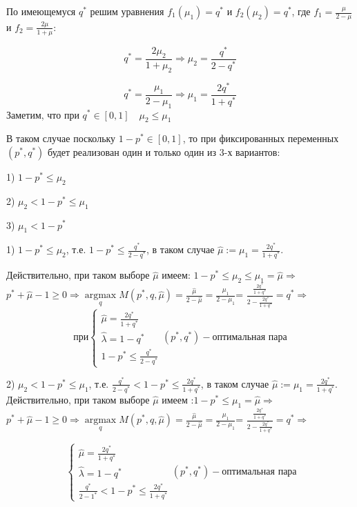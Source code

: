 \documentclass[letterpaper,12pt, reqno]{article}
\DeclareMathOperator*{\argmax}{argmax} %
\begin{document}
\begin{flushleft}

По имеющемуся $q^{*}$ решим уравнения $f_1(\mu_1)=q^{*}$ и $f_2(\mu_2)=q^{*}$, где
$f_1=\frac{\mu}{2-\mu}$ и $f_2=\frac{2\mu}{1+\mu}$:

$$q^{*}=\frac{2\mu_2}{1+\mu_2} \Rightarrow \mu_2=\frac{q^{*}}{2-q^{*}}$$

$$q^{*}=\frac{\mu_1}{2-\mu_1} \Rightarrow \mu_1=\frac{2q^{*}}{1+q^{*}}$$
Заметим, что при $q^{*} \in [0, 1] \quad \mu_2 \leq \mu_1$ 

В таком случае поскольку $1-p^{*} \in [0, 1]$, то при фиксированных переменных 
$(p^{*}, q^{*})$ будет реализован один и только один из 3-х вариантов:

1) $1-p^{*} \leq \mu_2$
  
2) $\mu_2 < 1-p^{*} \leq \mu_1$

3) $\mu_1 < 1-p^{*}$
\vspace{5mm}

1) $1-p^{*} \leq \mu_2$, т.е.  $1-p^{*} \leq \frac{q^{*}}{2-q^{*}}$, в таком случае
$\hat{\mu}:=\mu_1=\frac{2q^{*}}{1+q^{*}}$.

Действительно, при таком выборе $\hat{\mu}$ имеем:  $1-p^{*} \leq \mu_2 \leq \mu_1 = \hat{\mu} \Rightarrow$
$p^{*}+\hat{\mu}-1 \geq 0 \Rightarrow \argmax\limits_{q}M(p^{*},q,\hat{\mu})=
\frac{\hat{\mu}}{2-\hat{\mu}}=\frac{\mu_1}{2-\mu_1}$=
$\frac{\frac{2q^{*}}{1+q^{*}}}{2-\frac{2q^{*}}{1+q^{*}}}=q^{*} \Rightarrow$ 
\[
\textrm{при}
\begin{cases}
\hat{\mu}=\frac{2q^{*}}{1+q^{*}} \\
\hat{\lambda} = 1 - q^{*} \\
1-p^{*} \leq \frac{q^{*}}{2-q^{*}}
\end{cases}
(p^{*}, q^{*}) - \textrm{оптимальная пара}
\] 

2) $\mu_2 < 1-p^{*} \leq \mu_1$, т.е.  $\frac{q^{*}}{2-q^{*}} < 1-p^{*} \leq \frac{2q^{*}}{1+q^{*}}$,
в таком случае $\hat{\mu}:=\mu_1=\frac{2q^{*}}{1+q^{*}}$.
Действительно, при таком выборе $\hat{\mu}$ имеем :$1-p^{*} \leq \mu_1 = \hat{\mu} \Rightarrow$
$p^{*}+\hat{\mu}-1 \geq 0 \Rightarrow \argmax\limits_{q}M(p^{*},q,\hat{\mu})=
\frac{\hat{\mu}}{2-\hat{\mu}}=\frac{\mu_1}{2-\mu_1}$=
$\frac{\frac{2q^{*}}{1+q^{*}}}{2-\frac{2q^{*}}{1+q^{*}}}=q^{*} \Rightarrow$ 

\[\
\begin{cases}
\hat{\mu}=\frac{2q^{*}}{1+q^{*}} \\
\hat{\lambda} = 1 - q^{*} \\
\frac{q^{*}}{2-1^{*}} < 1-p^{*} \leq \frac{2q^{*}}{1+q^{*}}
\end{cases}
(p^{*}, q^{*}) - \textrm{оптимальная пара}
\] 


\end{flushleft}
\end{document}
